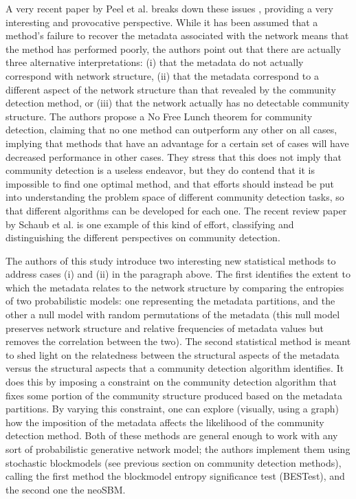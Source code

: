 A very recent paper by Peel et al. breaks down these issues
\autocite{peel_ground_2017}, providing a very interesting and
provocative perspective. While it has been assumed that a method's
failure to recover the metadata associated with the network means that
the method has performed poorly, the authors point out that there are
actually three alternative interpretations: (i) that the metadata do not
actually correspond with network structure, (ii) that the metadata
correspond to a different aspect of the network structure than that
revealed by the community detection method, or (iii) that the network
actually has no detectable community structure. The authors propose a No
Free Lunch theorem for community detection, claiming that no one method
can outperform any other on all cases, implying that methods that have
an advantage for a certain set of cases will have decreased performance
in other cases. They stress that this does not imply that community
detection is a useless endeavor, but they do contend that it is
impossible to find one optimal method, and that efforts should instead
be put into understanding the problem space of different community
detection tasks, so that different algorithms can be developed for each
one. The recent review paper by Schaub et al.
\autocite{schaub_many_2017} is one example of this kind of effort,
classifying and distinguishing the different perspectives on community
detection.

The authors of this study introduce two interesting new statistical
methods to address cases (i) and (ii) in the paragraph above. The first
identifies the extent to which the metadata relates to the network
structure by comparing the entropies of two probabilistic models: one
representing the metadata partitions, and the other a null model with
random permutations of the metadata (this null model preserves network
structure and relative frequencies of metadata values but removes the
correlation between the two). The second statistical method is meant to
shed light on the relatedness between the structural aspects of the
metadata versus the structural aspects that a community detection
algorithm identifies. It does this by imposing a constraint on the
community detection algorithm that fixes some portion of the community
structure produced based on the metadata partitions. By varying this
constraint, one can explore (visually, using a graph) how the imposition
of the metadata affects the likelihood of the community detection
method. Both of these methods are general enough to work with any sort
of probabilistic generative network model; the authors implement them
using stochastic blockmodels (see previous section on community
detection methods), calling the first method the blockmodel entropy
significance test (BESTest), and the second one the neoSBM.

